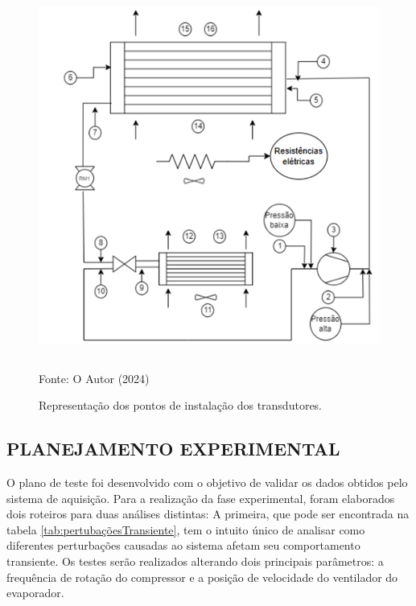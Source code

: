 \begin{figure}[ht]
    \centering
     \caption{Representação dos pontos de instalação dos transdutores.}
    \includegraphics[width=11.75cm, height=11.88cm]{FigurasdoTexto/Instalação Transdutores.png}
    \vspace{5pt}  %
    
    {\footnotesize Fonte: O Autor (2024)}  %
    \label{fig:instalação transdutores}
\end{figure}
\newpage
\subsection{PLANEJAMENTO EXPERIMENTAL}

O plano de teste foi desenvolvido com o objetivo de validar os dados obtidos pelo sistema de aquisição. Para a realização da fase experimental, foram elaborados dois roteiros para duas análises distintas: A primeira, que pode ser encontrada na tabela \ref{tab:pertubaçõesTransiente}, tem o intuito único de analisar como diferentes perturbações causadas ao sistema afetam seu comportamento transiente. Os testes serão realizados alterando dois principais parâmetros: a frequência de rotação do compressor e a posição de velocidade do ventilador do evaporador.

